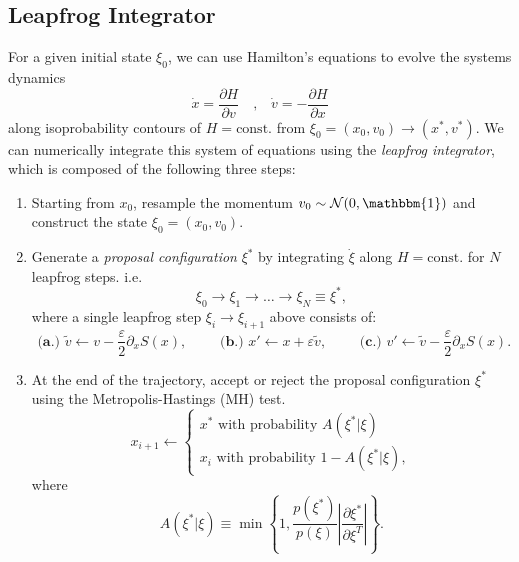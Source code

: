 \documentclass[a4paper,11pt]{article}
\newcommand{\acceptProb}{%
            A(\xi^{\ast}|\xi) \equiv \min\left\{1,
            \frac{p(\xi^{\ast})}{p(\xi)}%
        \left|\frac{\partial \xi^{\ast}}{\partial \xi^{T}}\right|\right\}
    }
\begin{document}
\subsection{\label{subsec:lfint}Leapfrog Integrator}
%
For a given initial state \(\xi_{0}\), we can use Hamilton's equations to
evolve the systems dynamics 
%
\begin{equation}
    \dot{x} = \frac{\partial H}{\partial v}\quad \text{,} \quad \dot{v} = -\frac{\partial H}{\partial x}
\end{equation}
%
along isoprobability contours of \(H =\text{const.}\) from \(\xi_{0} = (x_{0},
v_{0})\rightarrow (x^{\ast}, v^{\ast})\).
%
We can numerically integrate this system of equations using the \emph{leapfrog
integrator}, which is composed of the following three steps:
%
\begin{enumerate}
    \item Starting from \(x_{0}\), resample the momentum \(v_{0}\sim
        \mathcal{N}(0, \mathbbm{1})\) and construct the state \(\xi_{0} =
        (x_{0}, v_{0})\).
    \item Generate a \emph{proposal configuration} \(\xi^{\ast}\) by
        integrating \(\dot\xi\) along \(H = \mathrm{const.}\)
        for \(N\) leapfrog steps.
        i.e.
        \begin{equation}
            \xi_{0}\rightarrow \xi_{1}\rightarrow\ldots\rightarrow%
            \xi_{N} \equiv \xi^{\ast},
        \end{equation}
        where a single leapfrog step \(\xi_{i} \rightarrow \xi_{i+1}\) above
        consists of: 
        \begin{equation}
            \textbf{ (a.) }%
              \tilde{v}\leftarrow v - \frac{\varepsilon}{2}\partial_{x} S(x),
            \quad\quad
            \textbf{ (b.) }%
              x' \leftarrow x + \varepsilon \tilde{v},
            \quad\quad
            \textbf{ (c.) }%
              v' \leftarrow \tilde{v} - \frac{\varepsilon}{2}\partial_{x} S(x).
        \end{equation}
    \item At the end of the trajectory, accept or reject the proposal
        configuration \(\xi^{\ast}\) using the Metropolis-Hastings (MH) test.
        \begin{equation}
            x_{i+1} \leftarrow
            \begin{cases}
                x^{\ast}\text{ with probability } A(\xi^{\ast}|\xi)\\
                x_{i}\text{ with probability } 1 - A(\xi^{\ast}|\xi),
            \end{cases}
        \end{equation}
        where
        \begin{equation}
            \acceptProb.
        \end{equation}
\end{enumerate}
\end{document}
